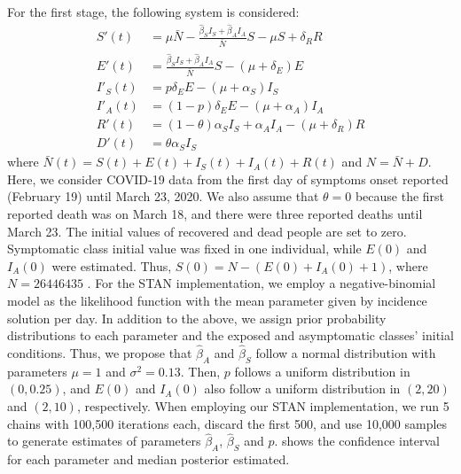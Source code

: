 For the first stage, the following system is considered:
\begin{equation}\label{model_stage1}
  \begin{aligned}
	S'(t)&=\mu \bar{N}-\frac{\hat{\beta}_S
	I_S+\hat{\beta}_AI_A}{\bar{N}}S-\mu S + \delta_R R\\
	E'(t)&= \frac{\hat{\beta}_S I_S+\hat{\beta}_A
	I_A}{\bar{N}}S-(\mu+\delta_E) E \\
	I'_S(t)&= p \delta_E E-(\mu+\alpha_S) I_S\\
	I'_A(t)&= (1-p) \delta_E E-(\mu+\alpha_A) I_A \\
	R'(t)&= (1-\theta) \alpha_S I_S+\alpha_A I_A-(\mu+\delta_R) R \\
	D'(t)&= \theta \alpha_S I_S
  \end{aligned}
\end{equation}
where $\bar{N}(t)=S(t)+E(t)+I_S(t)+I_A(t)+R(t)$ and $N=\bar{N}+D$.
Here, we consider COVID-19 data from the first day of symptoms onset
reported (February 19) until March 23, 2020. We also assume that
$\theta = 0$ because the first reported death was on March 18, and
there were three reported deaths until March 23. The initial values of
recovered and dead people are set to zero. Symptomatic class initial
value was fixed in one individual, while $E(0)$ and $I_{A}(0)$ were
estimated. Thus, $S(0) = N - (E(0) + I_{A}(0) + 1)$, where $N =
26446435$ \cite{conavi2020}. For the STAN implementation, we employ a
negative-binomial model as the likelihood function with the mean
parameter given by incidence solution per day. In addition to the
above, we assign prior probability distributions to each parameter and
the exposed and asymptomatic classes' initial conditions. Thus, we
propose that $\hat{\beta}_A$ and $\hat{\beta}_S$ follow a normal
distribution with parameters $\mu = 1$ and $\sigma^2 = 0.13$. Then,
$p$ follows a uniform distribution in $(0, 0.25)$, and $E(0)$ and
$I_{A}(0)$ also follow a uniform distribution in $(2,20)$ and
$(2,10)$, respectively. When employing our STAN implementation, we run
5 chains with 100,500 iterations each, discard the first 500, and use
10,000 samples to generate estimates of parameters $\hat{\beta}_A$,
$\hat{\beta}_S$ and $p$.  shows the confidence
interval for each parameter and median posterior estimated.
